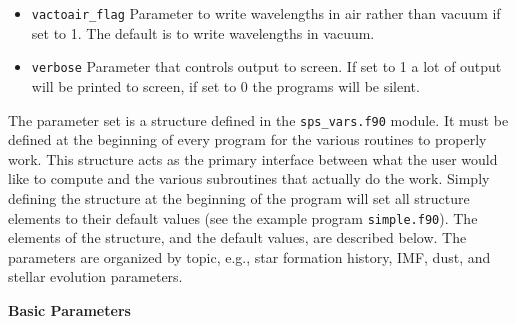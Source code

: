 \documentclass[]{article}
\begin{document}
\begin{itemize}
\item \texttt{vactoair\_flag}
Parameter to write wavelengths in air rather than vacuum if set to 1.
The default is to write wavelengths in vacuum.
\end{itemize}

\begin{itemize}
\item \texttt{verbose}
Parameter that controls output to screen.  If set to 1 a lot of output will be
printed to screen, if set to 0 the programs will be silent.
\end{itemize}

\clearpage

\vspace{0.1in}
\vspace{0.1in}

\noindent
The parameter set is a structure defined in the \texttt{sps\_vars.f90} module.
It must be defined at the beginning of every program for the various routines to
properly work.  This structure acts as the primary interface between what the
user would like to compute and the various subroutines that actually do the
work.  Simply defining the structure at the beginning of the program will set
all structure elements to their default values (see the example program
\texttt{simple.f90}). The elements of the structure, and the default values, are
described below.  The parameters are organized by topic, e.g., star formation
history, IMF, dust, and stellar evolution parameters.

\vspace{0.3cm}

\noindent
{\bf Basic Parameters}
\end{document}
